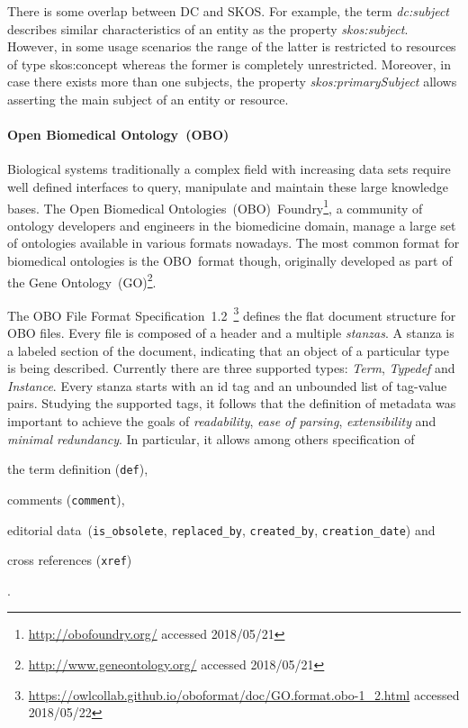 \documentclass[draft,final]{vutinfth} %
\begin{document}
There is some overlap between DC and SKOS. For example, the term \textit{dc:subject} describes similar characteristics of an entity as the property \textit{skos:subject}. However, in some usage scenarios the range of the latter is restricted to resources of type skos:concept whereas the former is completely unrestricted. Moreover, in case there exists more than one subjects, the property \textit{skos:primarySubject} allows asserting the main subject of an entity or resource. 

\paragraph{Open Biomedical Ontology~(OBO)} Biological systems traditionally a complex field with increasing data sets require well defined interfaces to query, manipulate and maintain these large knowledge bases. The Open Biomedical Ontologies~(OBO)~Foundry\footnote{\url{http://obofoundry.org/} accessed 2018/05/21}, a community of ontology developers and engineers in the biomedicine domain, manage a large set of ontologies available in various formats nowadays. The most common format for biomedical ontologies is the OBO~format though, originally developed as part of the Gene Ontology~(GO)\footnote{\url{http://www.geneontology.org/} accessed 2018/05/21}. 

The OBO File Format Specification~1.2~\footnote{\url{https://owlcollab.github.io/oboformat/doc/GO.format.obo-1_2.html} accessed 2018/05/22} defines the flat document structure for OBO files. Every file is composed of a header and a multiple \emph{stanzas}. A stanza is a labeled section of the document, indicating that an object of a particular type is being described. Currently there are three supported types: \textit{Term}, \textit{Typedef} and \textit{Instance}. Every stanza starts with an id tag and an unbounded list of tag-value pairs. Studying the supported tags, it follows that the definition of metadata was important to achieve the goals of \textit{readability}, \textit{ease of parsing}, \textit{extensibility} and \textit{minimal redundancy}. In particular, it allows among others specification of 
\begin{inparaenum}[1)]
		\item the term definition (\texttt{def}),
		\item comments (\texttt{comment}),
		\item editorial data~(\texttt{is\_obsolete}, \texttt{replaced\_by}, \texttt{created\_by}, \texttt{creation\_date}) and
		\item cross references (\texttt{xref})
\end{inparaenum}.
\end{document}
